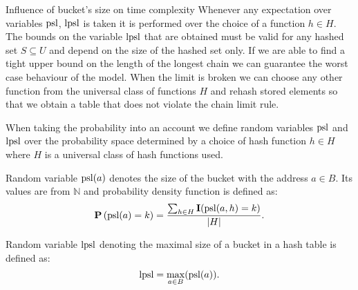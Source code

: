 \begin{section}{Influence of bucket's size on time complexity}
Whenever any expectation over variables $\mathrm{psl}$, $\mathrm{lpsl}$ is taken it is performed over the choice of a function $h \in H$. The bounds on the variable $\mathrm{lpsl}$ that are obtained must be valid for any hashed set $S \subseteq U$ and depend on the size of the hashed set only. If we are able to find a tight upper bound on the length of the longest chain we can guarantee the worst case behaviour of the model. When the limit is broken we can choose any other function from the universal class of functions $H$ and rehash stored elements so that we obtain a table that does not violate the chain limit rule.

When taking the probability into an account we define random variables $\mathrm{psl}$ and $\mathrm{lpsl}$ over the probability space determined by a choice of hash function $h \in H$ where $H$ is a universal class of hash functions used.

\begin{definition}
Random variable $\mathrm{psl}(a)$ denotes the size of the bucket with the address $a \in B$. Its values are from $\mathbb{N}$ and probability density function is defined as:
\[
\mathbf{P}\left(\mathrm{psl}(a) = k\right) = \frac{\sum_{h \in H} \mathbf{I}(\mathrm{psl}(a, h) = k)}{|H|}\text{.}
\]

Random variable $\mathrm{lpsl}$ denoting the maximal size of a bucket in a hash table is defined as:
\[
\mathrm{lpsl} = \displaystyle\max_{a \in B}(\mathrm{psl}(a))\text{.}
\]
\end{definition}
\end{section}

